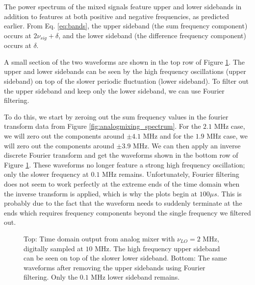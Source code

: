 \documentclass[12pt]{article}
\begin{document}
The power spectrum of the mixed signals feature upper and lower sidebands in addition to features at both positive and negative frequencies, as predicted earlier. From Eq. \ref{eq:bands}, the upper sideband (the sum frequency component) occurs at $2\nu_{sig} + \delta$, and the lower sideband (the difference frequency component) occurs at $\delta$.

A small section of the two waveforms are shown in the top row of Figure \ref{fig:analogmixing_signal}. The upper and lower sidebands can be seen by the high frequency oscillations (upper sideband) on top of the slower periodic fluctuation (lower sideband). To filter out the upper sideband and keep only the lower sideband, we can use Fourier filtering.

To do this, we start by zeroing out the sum frequency values in the fourier transform data from Figure \ref{fig:analogmixing_spectrum}. For the $2.1$ MHz case, we will zero out the components around $\pm4.1$ MHz and for the $1.9$ MHz case, we will zero out the components around $\pm3.9$ MHz. We can then apply an inverse discrete Fourier transform and get the waveforms shown in the bottom row of Figure \ref{fig:analogmixing_signal}. These waveforms no longer feature a strong high frequency oscillation; only the slower frequency at $0.1$ MHz remains. Unfortunately, Fourier filtering does not seem to work perfectly at the extreme ends of the time domain when the inverse transform is applied, which is why the plots begin at $100 \mu s$. This is probably due to the fact that the waveform needs to suddenly terminate at the ends which requires frequency components beyond the single frequency we filtered out.

\begin{figure}[H]
\caption[SODUMB]{Top: Time domain output from analog mixer with $\nu_{LO}=2$ MHz, digitally sampled at $10$ MHz. The high frequency upper sideband can be seen on top of the slower lower sideband. Bottom: The same waveforms after removing the upper sidebands using Fourier filtering. Only the $0.1$ MHz lower sideband remains.}
\label{fig:analogmixing_signal}
\end{figure}
\end{document}

